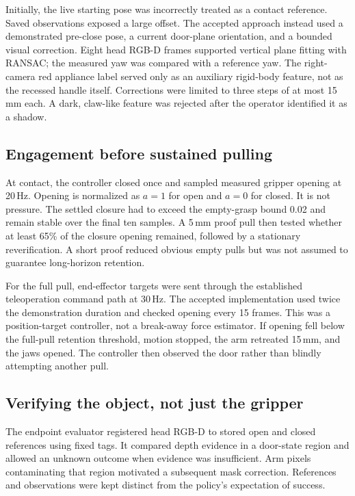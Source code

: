 Initially, the live starting pose was incorrectly treated as a contact
reference. Saved observations exposed a large offset. The accepted approach
instead used a demonstrated pre-close pose, a current door-plane orientation,
and a bounded visual correction. Eight head RGB-D frames supported vertical
plane fitting with RANSAC; the measured yaw was compared with a reference yaw.
The right-camera red appliance label served only as an auxiliary rigid-body
feature, not as the recessed handle itself. Corrections were limited to three
steps of at most 15\,mm each. A dark, claw-like feature was rejected after the
operator identified it as a shadow.

\subsection{Engagement before sustained pulling}
At contact, the controller closed once and sampled measured gripper opening
at 20\,Hz. Opening is normalized as $a=1$ for open and $a=0$ for closed. It is
not pressure. The settled closure had to exceed the empty-grasp bound 0.02 and
remain stable over the final ten samples. A 5\,mm proof pull then tested whether
at least 65\% of the closure opening remained, followed by a stationary
reverification. A short proof reduced obvious empty pulls but was not assumed
to guarantee long-horizon retention.

For the full pull, end-effector targets were sent through the established
teleoperation command path at 30\,Hz. The accepted implementation used twice
the demonstration duration and checked opening every 15 frames. This was a
position-target controller, not a break-away force estimator. If opening fell
below the full-pull retention threshold, motion stopped, the arm retreated
15\,mm, and the jaws opened. The controller then observed the door rather than
blindly attempting another pull.

\subsection{Verifying the object, not just the gripper}
The endpoint evaluator registered head RGB-D to stored open and closed
references using fixed tags. It compared depth evidence in a door-state region
and allowed an unknown outcome when evidence was insufficient. Arm pixels
contaminating that region motivated a subsequent mask correction. References
and observations were kept distinct from the policy's expectation of success.

